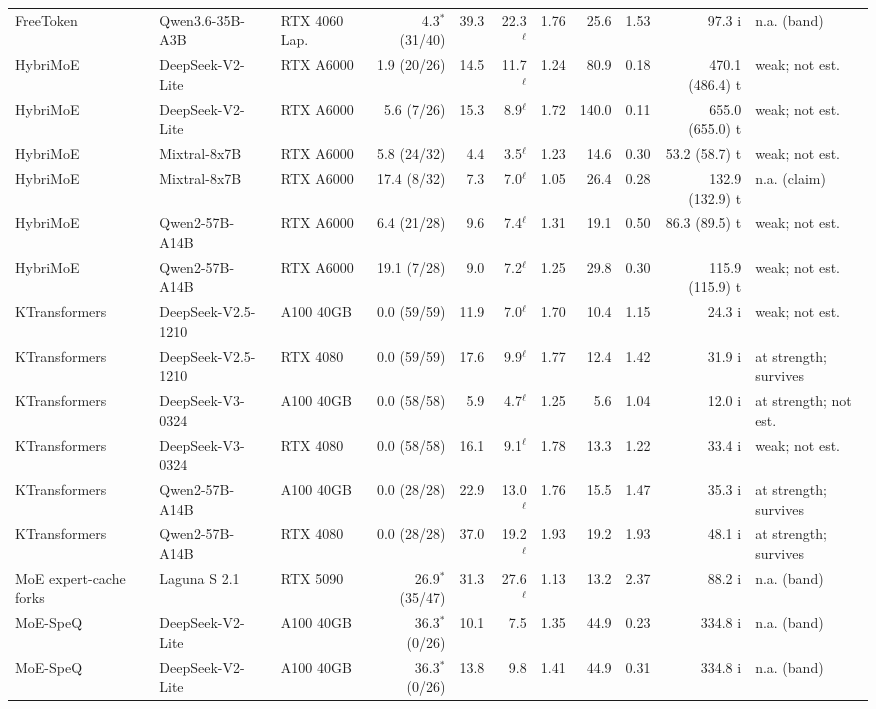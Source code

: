 {\begin{longtable}{p{2.2cm}p{2.1cm}p{1.5cm}rrrrrrrl}
FreeToken & Qwen3.6-35B-A3B & RTX 4060 Lap. & 4.3$^\ast$ (31/40) & 39.3 & 22.3$^\ell$ & 1.76 & 25.6 & 1.53 & 97.3 i & n.a. (band) \\
HybriMoE & DeepSeek-V2-Lite & RTX A6000 & 1.9 (20/26) & 14.5 & 11.7$^\ell$ & 1.24 & 80.9 & 0.18 & 470.1 (486.4) t & weak; not est. \\
HybriMoE & DeepSeek-V2-Lite & RTX A6000 & 5.6 (7/26) & 15.3 & 8.9$^\ell$ & 1.72 & 140.0 & 0.11 & 655.0 (655.0) t & weak; not est. \\
HybriMoE & Mixtral-8x7B & RTX A6000 & 5.8 (24/32) & 4.4 & 3.5$^\ell$ & 1.23 & 14.6 & 0.30 & 53.2 (58.7) t & weak; not est. \\
HybriMoE & Mixtral-8x7B & RTX A6000 & 17.4 (8/32) & 7.3 & 7.0$^\ell$ & 1.05 & 26.4 & 0.28 & 132.9 (132.9) t & n.a. (claim) \\
HybriMoE & Qwen2-57B-A14B & RTX A6000 & 6.4 (21/28) & 9.6 & 7.4$^\ell$ & 1.31 & 19.1 & 0.50 & 86.3 (89.5) t & weak; not est. \\
HybriMoE & Qwen2-57B-A14B & RTX A6000 & 19.1 (7/28) & 9.0 & 7.2$^\ell$ & 1.25 & 29.8 & 0.30 & 115.9 (115.9) t & weak; not est. \\
KTransformers & DeepSeek-V2.5-1210 & A100 40GB & 0.0 (59/59) & 11.9 & 7.0$^\ell$ & 1.70 & 10.4 & 1.15 & 24.3 i & weak; not est. \\
KTransformers & DeepSeek-V2.5-1210 & RTX 4080 & 0.0 (59/59) & 17.6 & 9.9$^\ell$ & 1.77 & 12.4 & 1.42 & 31.9 i & at strength; survives \\
KTransformers & DeepSeek-V3-0324 & A100 40GB & 0.0 (58/58) & 5.9 & 4.7$^\ell$ & 1.25 & 5.6 & 1.04 & 12.0 i & at strength; not est. \\
KTransformers & DeepSeek-V3-0324 & RTX 4080 & 0.0 (58/58) & 16.1 & 9.1$^\ell$ & 1.78 & 13.3 & 1.22 & 33.4 i & weak; not est. \\
KTransformers & Qwen2-57B-A14B & A100 40GB & 0.0 (28/28) & 22.9 & 13.0$^\ell$ & 1.76 & 15.5 & 1.47 & 35.3 i & at strength; survives \\
KTransformers & Qwen2-57B-A14B & RTX 4080 & 0.0 (28/28) & 37.0 & 19.2$^\ell$ & 1.93 & 19.2 & 1.93 & 48.1 i & at strength; survives \\
MoE expert-cache forks & Laguna S 2.1 & RTX 5090 & 26.9$^\ast$ (35/47) & 31.3 & 27.6$^\ell$ & 1.13 & 13.2 & 2.37 & 88.2 i & n.a. (band) \\
MoE-SpeQ & DeepSeek-V2-Lite & A100 40GB & 36.3$^\ast$ (0/26) & 10.1 & 7.5 & 1.35 & 44.9 & 0.23 & 334.8 i & n.a. (band) \\
MoE-SpeQ & DeepSeek-V2-Lite & A100 40GB & 36.3$^\ast$ (0/26) & 13.8 & 9.8 & 1.41 & 44.9 & 0.31 & 334.8 i & n.a. (band) \\

\end{longtable}}
